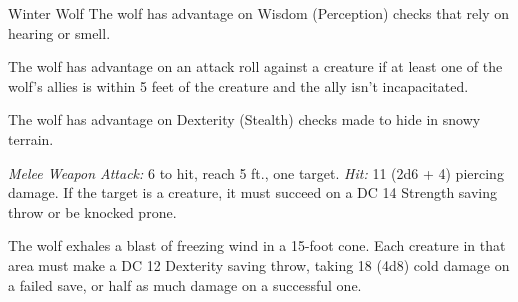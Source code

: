 \documentclass[10pt,a4paper,twoside,bg=print,twocolumn,openany,nodeprecatedcode]{dndbook}
\begin{document}
\begin{DndMonster}[float=t]{Winter Wolf}
\DndMonsterBasics[
armor-class = {13 (natural armor)},
hit-points = {\DndDice{10d10 + 20}},
speed = {50 ft.}
]
\DndMonsterAbilityScores[
 str = 18,
 dex = 13,
 con = 14,
 int = 7,
 wis = 12,
 cha = 8
]
\DndMonsterDetails[
skills = {Perception +5, Stealth +3},
damage-immunities = {cold},
languages = {Common, Giant, Winter Wolf},
challenge = 3,
]
The wolf has advantage on Wisdom (Perception) checks that rely on hearing or smell.

The wolf has advantage on an attack roll against a creature if at least one of the wolf's allies is within 5 feet of the creature and the ally isn't incapacitated.

The wolf has advantage on Dexterity (Stealth) checks made to hide in snowy terrain.

\textsl{Melee Weapon Attack:} 6 to hit, reach 5 ft., one target. \textsl{Hit:} 11 (2d6 + 4) piercing damage. If the target is a creature, it must succeed on a DC 14 Strength saving throw or be knocked prone.

The wolf exhales a blast of freezing wind in a 15-foot cone. Each creature in that area must make a DC 12 Dexterity saving throw, taking 18 (4d8) cold damage on a failed save, or half as much damage on a successful one.

\end{DndMonster}
\end{document}
